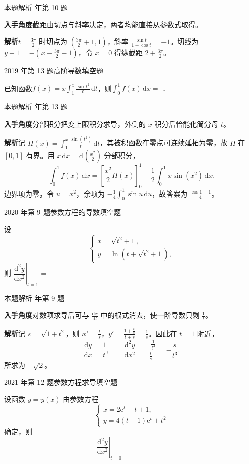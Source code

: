 \documentclass[UTF8,zihao=-4,fontset=fandol]{ctexart}
\newcommand{\blank}{\underline{\hspace{5em}}}
\newcommand{\QuestionPage}[6]{%
  \par\noindent\begin{minipage}{\linewidth}
  \raggedright
  {\small\textcolor{black!60}{#3\quad #5}\hfill\textcolor{accent}{#2}}\par\smallskip}
\newcommand{\QuestionEnd}{\end{minipage}\par\medskip}
\newcommand{\QuestionPage}[6]{%
  \clearpage
  {\small\textcolor{accent}{#1\hfill #2}}\par\medskip
  {\small\textcolor{black!60}{#3\quad #5\hfill #6}}\par\vspace{9bp}}
\newcommand{\QuestionEnd}{}
\newenvironment{QuestionSolution}[1]{%
  \clearpage
  {\small\textcolor{black!60}{本题解析\quad #1}}\par\medskip
}{\par\clearpage}
\begin{document}
\begin{QuestionSolution}{2019 年第 10 题}
\textbf{入手角度}\quad 截距由切点与斜率决定，两者均能直接从参数式取得。

\textbf{解析}\quad \(t=\frac{3\pi}{2}\) 时切点为 \((\frac{3\pi}{2}+1,1)\)，斜率
\(\frac{\sin t}{1-\cos t}=-1\)。切线为 \(y-1=-(x-\frac{3\pi}{2}-1)\)，令 \(x=0\) 得纵截距 \(\boxed{2+\frac{3\pi}{2}}\)。
\end{QuestionSolution}

\QuestionPage{2.2 求导的基本法则}{填空题}{2019 年第 13 题}{2}{高阶导数}{075 / 234}
已知函数$f(x) = x\int_1^x \frac{\sin t^2}{t} \,\mathrm{d} t$，则$\int_0^1 f(x)\,\mathrm{d} x =$ \blank{}．
\QuestionEnd

\begin{QuestionSolution}{2019 年第 13 题}
\textbf{入手角度}\quad 分部积分把变上限积分求导，外侧的 \(x\) 积分后恰能化简分母 \(t\)。

\textbf{解析}\quad 记 \(H(x)=\int_1^x\frac{\sin(t^2)}{t}\,\mathrm{d}t\)，其被积函数在零点可连续延拓为零，故 \(H\) 在 \([0,1]\) 有界。用 \(x\,\mathrm{d}x=\mathrm{d}\!\left(\frac{x^2}{2}\right)\) 分部积分，
\[
\int_0^1 f(x)\,\mathrm{d}x
=\left[\frac{x^2}{2}H(x)\right]_0^1
-\frac12\int_0^1 x\sin(x^2)\,\mathrm{d}x.
\]
边界项为零，令 \(u=x^2\)，余项为 \(-\tfrac14\int_0^1\sin u\,\mathrm{d}u\)，故答案为 \(\boxed{\frac{\cos1-1}{4}}\)。
\end{QuestionSolution}

\QuestionPage{2.2 求导的基本法则}{填空题}{2020 年第 9 题}{2}{参数方程的导数}{076 / 234}
设
\[\begin{cases}
x=\sqrt{t^2+1},\\
y=\ln\!\left(t+\sqrt{t^2+1}\right),
\end{cases}
\]
则 \(\left.\dfrac{\mathrm{d}^2y}{\mathrm{d}x^2}\right|_{t=1}=\)
\blank{}
\QuestionEnd

\begin{QuestionSolution}{2020 年第 9 题}
\textbf{入手角度}\quad 对数项求导后可与 \(\frac{\mathrm{d}x}{\mathrm{d}t}\) 中的根式消去，使一阶导数只剩 \(\frac{1}{t}\)。

\textbf{解析}\quad 记 \(s=\sqrt{1+t^2}\)，则 \(x'=\frac{t}{s}\)，\(y'=\frac{1+\frac{t}{s}}{t+s}=\frac{1}{s}\)。因此在 \(t=1\) 附近，
\[
\frac{\mathrm{d}y}{\mathrm{d}x}=\frac1t,\qquad
\frac{\mathrm{d}^2y}{\mathrm{d}x^2}=\frac{-\frac{1}{t^2}}{\frac{t}{s}}=-\frac{s}{t^3}.
\]
所求为 \(\boxed{-\sqrt2}\)。
\end{QuestionSolution}

\QuestionPage{2.2 求导的基本法则}{填空题}{2021 年第 12 题}{2}{参数方程求导}{077 / 234}
设函数 \(y=y(x)\) 由参数方程
\[\begin{cases}
x=2\mathrm{e}^t+t+1,\\
y=4(t-1)\mathrm{e}^t+t^2
\end{cases}
\]
确定，则
\[\left.\frac{\mathrm{d}^2 y}{\mathrm{d} x^2}\right|_{t=0}= \blank{}
\]
\QuestionEnd
\end{document}
